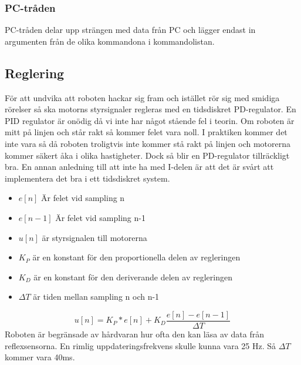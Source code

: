 \subsubsection{PC-tråden}
PC-tråden delar upp strängen med data från PC och lägger endast in argumenten från de olika kommandona i kommandolistan.

\subsection{Reglering}
För att undvika att roboten hackar sig fram och istället rör sig med smidiga rörelser så ska motorns styrsignaler regleras med en tidsdiskret PD-regulator. En PID regulator är onödig då vi inte har något stående fel i teorin. Om roboten är mitt på linjen och står rakt så kommer felet vara noll. I praktiken kommer det inte vara så då roboten troligtvis inte kommer stå rakt på linjen och motorerna kommer säkert åka i olika hastigheter. Dock så blir en PD-regulator tillräckligt bra. En annan anledning till att inte ha med I-delen är att det är svårt att implementera det bra i ett tidsdiskret system. 
\begin{itemize}
\item $e[n]$ Är felet vid sampling n
\item $e[n-1]$ Är felet vid sampling n-1
\item $u[n]$ är styrsignalen till motorerna
\item $K_{P}$ är en konstant för den proportionella delen av regleringen
\item $K_{D}$ är en konstant för den deriverande delen av regleringen
\item $\Delta T$ är tiden mellan sampling n och n-1
 
\end{itemize}
 $$ u[n] = K_P*e[n] + K_D\frac{e[n]-e[n-1]}{\Delta T}$$
 Roboten är begränsade av hårdvaran hur ofta den kan läsa av data från reflexsensorna. En rimlig uppdateringsfrekvens skulle kunna vara 25 Hz\cite{handledare}. Så $\Delta T$ kommer vara 40ms.


